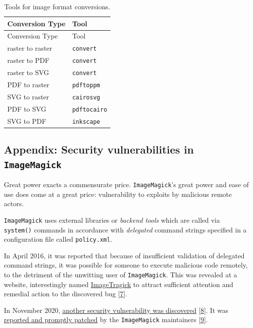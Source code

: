 \documentclass[
  a4paper,
]{article}
\begin{document}
\hypertarget{tbl:formats}{}
\begin{longtable}[]{@{}ll@{}}
\caption{\label{tbl:formats}Tools for image format
conversions.}\tabularnewline
\toprule\noalign{}
Conversion Type & Tool \\
\midrule\noalign{}
\endfirsthead
\toprule\noalign{}
Conversion Type & Tool \\
\midrule\noalign{}
\endhead
\bottomrule\noalign{}
\endlastfoot
raster to raster & \texttt{convert} \\
raster to PDF & \texttt{convert} \\
raster to SVG & \texttt{convert} \\
PDF to raster & \texttt{pdftoppm} \\
SVG to raster & \texttt{cairosvg} \\
PDF to SVG & \texttt{pdftocairo} \\
SVG to PDF & \texttt{inkscape} \\
\end{longtable}

\hypertarget{appendix-security-vulnerabilities-in-imagemagick}{%
\subsection{\texorpdfstring{Appendix: Security vulnerabilities in
\texttt{ImageMagick}}{Appendix: Security vulnerabilities in ImageMagick}}\label{appendix-security-vulnerabilities-in-imagemagick}}

Great power exacts a commensurate price. \texttt{ImageMagick}'s great
power and ease of use does come at a great price: vulnerability to
exploits by malicious remote actors.

\texttt{ImageMagick} uses external libraries or \emph{backend tools}
which are called via \texttt{system()} commands in accordance with
\emph{delegated} command strings specified in a configuration file
called \texttt{policy.xml}.

In April 2016, it was reported that because of insufficient validation
of delegated command strings, it was possible for someone to execute
malicious code remotely, to the detriment of the unwitting user of
\texttt{ImageMagick}. This was revealed at a website, interestingly
named \href{https://imagetragick.com/}{ImageTragick} to attract
sufficient attention and remedial action to the discovered bug
{[}\protect\hyperlink{ref-imagetragick2016}{7}{]}.

In November 2020,
\href{https://portswigger.net/daily-swig/imagemagick-pdf-parsing-flaw-allowed-attacker-to-execute-shell-commands-via-maliciously-crafted-image}{another
security vulnerability was discovered}
{[}\protect\hyperlink{ref-leyden2020}{8}{]}. It was
\href{https://insert-script.blogspot.com/2020/11/imagemagick-shell-injection-via-pdf.html}{reported
and promptly patched} by the \texttt{ImageMagick} maintainers
{[}\protect\hyperlink{ref-infuhr2020}{9}{]}.
\end{document}
